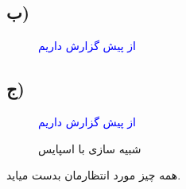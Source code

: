 \subsection{ب)}
\begin{figure}[h]
    \centering
    \caption{\textcolor{blue}{از پیش گزارش داریم}}
\end{figure}
\pagebreak
\subsection{ج)}
\begin{figure}[!h]
    \centering
    \caption{\textcolor{blue}{از پیش گزارش داریم}}
\end{figure}
\begin{figure}[h]
    \centering
    \caption{شبیه سازی با اسپایس}
\end{figure}
همه چیز مورد انتظارمان بدست میاید.
\pagebreak
